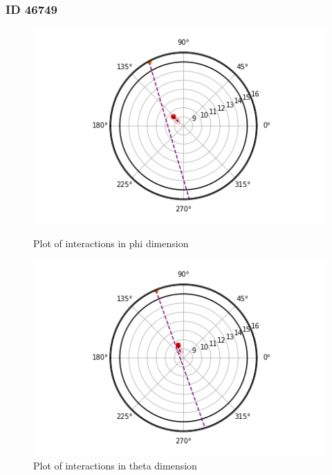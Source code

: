 \documentclass[a4paper]{article}
\begin{document}
\subsubsection{ID 46749}
\begin{figure}[H]
    \centering
    \begin{minipage}{.5\textwidth}
        \centering
        \includegraphics[width=1\linewidth]{id 46749/achinos_46749_phi.png}
        \caption{Plot of interactions in phi dimension}
        \label{fig:prob1_6_2}
    \end{minipage}%
    \begin{minipage}{0.5\textwidth}
        \centering
        \includegraphics[width=1\linewidth]{id 46749/achinos_46749_theta.png}
        \caption{Plot of interactions in theta dimension}
        \label{fig:prob1_6_1}
    \end{minipage}
\end{figure}
\end{document}
